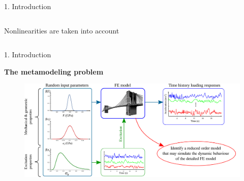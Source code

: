\documentclass[10pt,xcolor = dvipsnames]{beamer}
\newcommand{\hc}[1]{\hspace*{#1cm}}
\begin{document}
\begin{frame}{1. Introduction}
\begin{columns}
\begin{block}{\small Nonlinearities are taken into account}
\end{block}

\end{columns}


\end{frame}



\begin{frame}{1. Introduction}

{\bf The metamodeling problem}

\begin{figure}[t!]
\hc{-0.4}\includegraphics[width = 1.1\textwidth]{FEMsimulations.pdf}
\end{figure}



\end{frame}
\end{document}
